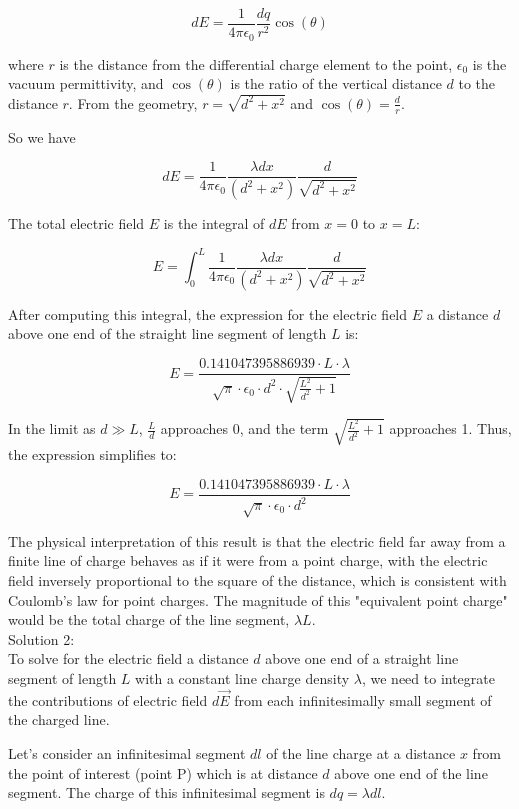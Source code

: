 \documentclass[a4paper,11pt]{article}
\begin{document}
\[ dE = \frac{1}{4\pi\epsilon_0} \frac{dq}{r^2} \cos(\theta) \]

where \( r \) is the distance from the differential charge element to the point, \( \epsilon_0 \) is the vacuum permittivity, and \( \cos(\theta) \) is the ratio of the vertical distance \( d \) to the distance \( r \). From the geometry, \( r = \sqrt{d^2 + x^2} \) and \( \cos(\theta) = \frac{d}{r} \).

So we have

\[ dE = \frac{1}{4\pi\epsilon_0} \frac{\lambda dx}{(d^2 + x^2)} \frac{d}{\sqrt{d^2 + x^2}} \]

The total electric field \( E \) is the integral of \( dE \) from \( x = 0 \) to \( x = L \):

\[ E = \int_0^L \frac{1}{4\pi\epsilon_0} \frac{\lambda dx}{(d^2 + x^2)} \frac{d}{\sqrt{d^2 + x^2}} \]

After computing this integral, the expression for the electric field \( E \) a distance \( d \) above one end of the straight line segment of length \( L \) is:

\[ E = \frac{0.141047395886939 \cdot L \cdot \lambda}{\sqrt{\pi} \cdot \epsilon_0 \cdot d^2 \cdot \sqrt{\frac{L^2}{d^2} + 1}} \]

In the limit as \( d \gg L \), \( \frac{L}{d} \) approaches 0, and the term \( \sqrt{\frac{L^2}{d^2} + 1} \) approaches 1. Thus, the expression simplifies to:

\[ E = \frac{0.141047395886939 \cdot L \cdot \lambda}{\sqrt{\pi} \cdot \epsilon_0 \cdot d^2} \]

The physical interpretation of this result is that the electric field far away from a finite line of charge behaves as if it were from a point charge, with the electric field inversely proportional to the square of the distance, which is consistent with Coulomb's law for point charges. The magnitude of this "equivalent point charge" would be the total charge of the line segment, \( \lambda L \). \\

\noindent Solution 2: \\

To solve for the electric field a distance \( d \) above one end of a straight line segment of length \( L \) with a constant line charge density \( \lambda \), we need to integrate the contributions of electric field \( d\vec{E} \) from each infinitesimally small segment of the charged line.

Let's consider an infinitesimal segment \( dl \) of the line charge at a distance \( x \) from the point of interest (point P) which is at distance \( d \) above one end of the line segment. The charge of this infinitesimal segment is \( dq = \lambda dl \).
\end{document}
